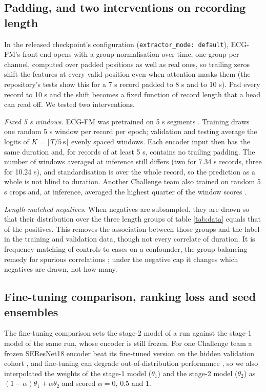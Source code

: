\documentclass{iopjournal}
\begin{document}
\subsection{Padding, and two interventions on recording length}
\label{sec:length}
In the released checkpoint's configuration (\texttt{extractor\_mode: default}), ECG-FM's front end opens with a group normalisation over time, one group per channel, computed over padded positions as well as real ones, so trailing zeros shift the features at every valid position even when attention masks them (the repository's tests show this for a 7 s record padded to 8 s and to 10 s). Pad every record to 10 s and the shift becomes a fixed function of record length that a head can read off. We tested two interventions.

\textit{Fixed 5 s windows.} ECG-FM was pretrained on 5 s segments \citep{mckeen2025}. Training draws one random 5 s window per record per epoch; validation and testing average the logits of $K=\lceil T/5\,\mathrm{s}\rceil$ evenly spaced windows. Each encoder input then has the same duration and, for records of at least 5 s, contains no trailing padding. The number of windows averaged at inference still differs (two for 7.34 s records, three for 10.24 s), and standardisation is over the whole record, so the prediction as a whole is not blind to duration. Another Challenge team also trained on random 5 s crops and, at inference, averaged the highest quarter of the window scores \citep{dong2025}.

\textit{Length-matched negatives.} When negatives are subsampled, they are drawn so that their distribution over the three length groups of table \ref{tab:data} equals that of the positives. This removes the association between those groups and the label in the training and validation data, though not every correlate of duration. It is frequency matching of controls to cases on a confounder, the group-balancing remedy for spurious correlations \citep{idrissi2022,sagawa2020}; under the negative cap it changes which negatives are drawn, not how many.

\subsection{Fine-tuning comparison, ranking loss and seed ensembles}
\label{sec:compare}
The fine-tuning comparison sets the stage-2 model of a run against the stage-1 model of the same run, whose encoder is still frozen. For one Challenge team a frozen SEResNet18 encoder beat its fine-tuned version on the hidden validation cohort \citep{wang2025}, and fine-tuning can degrade out-of-distribution performance \citep{kumar2022}, so we also interpolated the weights of the stage-1 model ($\theta_1$) and the stage-2 model ($\theta_2$) as $(1-\alpha)\theta_1+\alpha\theta_2$ \citep{wortsman2022} and scored $\alpha=0$, 0.5 and 1.
\end{document}
